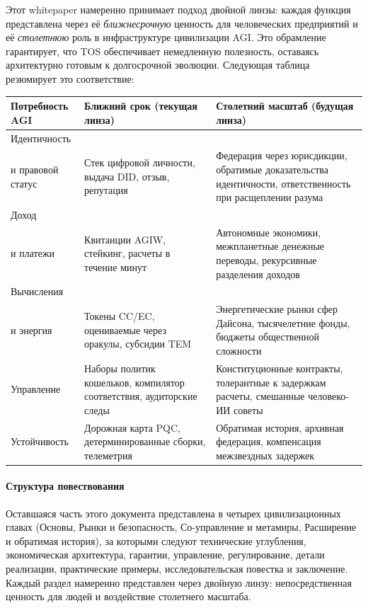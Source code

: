 \documentclass[11pt]{article}
\begin{document}
Этот whitepaper намеренно принимает подход двойной линзы: каждая функция представлена через её \emph{ближнесрочную} ценность для человеческих предприятий и её \emph{столетнюю} роль в инфраструктуре цивилизации AGI. Это обрамление гарантирует, что TOS обеспечивает немедленную полезность, оставаясь архитектурно готовым к долгосрочной эволюции. Следующая таблица резюмирует это соответствие:

\begin{longtable}{@{}p{}p{}p{}@{}}
\toprule
\textbf{Потребность AGI} & \textbf{Ближний срок (текущая линза)} & \textbf{Столетний масштаб (будущая линза)} \\\midrule
Идентичность \\ и правовой статус & Стек цифровой личности, выдача DID, отзыв, репутация & Федерация через юрисдикции, обратимые доказательства идентичности, ответственность при расщеплении разума \\
Доход \\ и платежи & Квитанции AGIW, стейкинг, расчеты в течение минут & Автономные экономики, межпланетные денежные переводы, рекурсивные разделения доходов \\
Вычисления \\ и энергия & Токены CC/EC, оцениваемые через оракулы, субсидии TEM & Энергетические рынки сфер Дайсона, тысячелетние фонды, бюджеты общественной сложности \\
Управление & Наборы политик кошельков, компилятор соответствия, аудиторские следы & Конституционные контракты, толерантные к задержкам расчеты, смешанные человеко-ИИ советы \\
Устойчивость & Дорожная карта PQC, детерминированные сборки, телеметрия & Обратимая история, архивная федерация, компенсация межзвездных задержек \\\bottomrule
\end{longtable}

\paragraph{Структура повествования} Оставшаяся часть этого документа представлена в четырех цивилизационных главах (Основы, Рынки и безопасность, Со-управление и метамиры, Расширение и обратимая история), за которыми следуют технические углубления, экономическая архитектура, гарантии, управление, регулирование, детали реализации, практические примеры, исследовательская повестка и заключение. Каждый раздел намеренно представлен через двойную линзу: непосредственная ценность для людей и воздействие столетнего масштаба.
\end{document}
